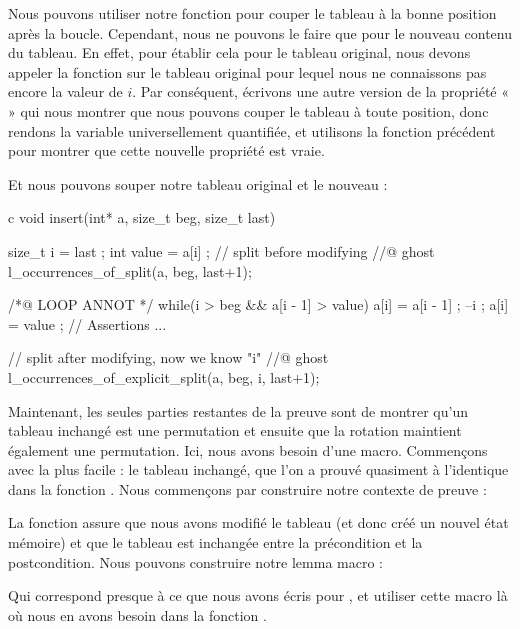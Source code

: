 Nous pouvons utiliser notre fonction pour couper le tableau à la bonne position
après la boucle. Cependant, nous ne pouvons le faire que pour le nouveau contenu
du tableau. En effet, pour établir cela pour le tableau original, nous devons 
appeler la fonction sur le tableau original pour lequel nous ne connaissons pas
encore la valeur de $i$. Par conséquent, écrivons une autre version de la 
propriété «  » qui nous montrer que nous pouvons couper le tableau à toute
position, donc rendons la variable  universellement quantifiée,
et utilisons la fonction précédent pour montrer que cette nouvelle propriété est
vraie.




Et nous pouvons souper notre tableau original et le nouveau :


\begin{CodeBlock}{c}
void insert(int* a, size_t beg, size_t last){
  size_t i = last ;
  int value = a[i] ;
  // split before modifying
  //@ ghost l_occurrences_of_split(a, beg, last+1);

  /*@ LOOP ANNOT */
  while(i > beg && a[i - 1] > value){
    a[i] = a[i - 1] ;
    --i ;
  }
  a[i] = value ;
  // Assertions ...

  // split after modifying, now we know "i"
  //@ ghost l_occurrences_of_explicit_split(a, beg, i, last+1);
}
\end{CodeBlock}


Maintenant, les seules parties restantes de la preuve sont de montrer qu'un tableau
inchangé est une permutation et ensuite que la rotation maintient également une
permutation. Ici, nous avons besoin d'une macro. Commençons avec la plus facile :
le tableau inchangé, que l'on a prouvé quasiment à l'identique dans la fonction
. Nous commençons par construire notre contexte de
preuve :




La fonction  assure que nous avons 
modifié le tableau (et donc créé un nouvel état mémoire) et que le tableau est
inchangée entre la précondition et la postcondition. Nous pouvons construire 
notre lemma macro :




Qui correspond presque à ce que nous avons écris pour ,
et utiliser cette macro là où nous en avons besoin dans la fonction
.


